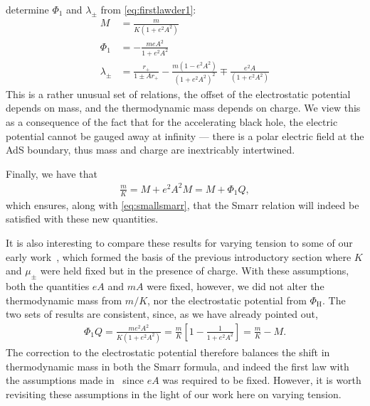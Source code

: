 \documentclass[
twoside,
openright,
frontopenright,
]{dmathesis}
\newcommand{\nn}{\nonumber}
\begin{document}
determine $\Phi_1$ and $\lambda_\pm$ from \cref{eq:firstlawder1}:
\begin{align}
M &= \frac{m}{K(1+e^2 A^2)} \nn\\
\Phi_1 &= -\frac{meA^2}{1+e^2 A^2}\nn\\
\lambda_\pm &= \frac{r_+}{1\pm Ar_+} - \frac{m(1-e^2A^2)}{(1+e^2 A^2)^2} 
\mp \frac{e^2A}{(1+e^2 A^2)}
\label{TDparams}
\end{align}
This is a rather unusual set of relations, the offset of the electrostatic
potential depends on mass, and the thermodynamic mass depends on charge. We view
this as a consequence of the fact that for the accelerating black hole, the
electric potential cannot be gauged away at infinity --- there is a polar
electric field at the AdS boundary, thus mass and charge are inextricably
intertwined.

Finally, we have that
\begin{align}
  \frac{m}{K} = M+e^2A^2M = M+\Phi_1Q,
\end{align}
which ensures, along with \cref{eq:smallsmarr}, that the Smarr relation will
indeed be satisfied with these new quantities.

It is also interesting to compare these results for varying tension to some of
our early work~\cite{Appels:2016uha}, which formed the basis of the previous
introductory section where $K$ and $\mu_\pm$ were held fixed but in the presence
of charge. With these assumptions, both the quantities $eA$ and $mA$ were fixed,
however, we did not alter the thermodynamic mass from $m/K$, nor the
electrostatic potential from $\Phi_\mathrm{H}$. The two sets of results are
consistent, since, as we have already pointed out,
\begin{align*}
\Phi_1 Q = \frac{m e^2 A^2}{K(1+e^2 A^2)} 
= \frac{m}{K} \left [ 1 - \frac{1}{1+e^2 A^2} \right] = \frac{m}{K} - M.
\end{align*}
The correction to the electrostatic potential therefore balances the shift in
thermodynamic mass in both the Smarr formula, and indeed the first law with the
assumptions made in~\cite{Appels:2016uha} since $eA$ was required to be
fixed. However, it is worth revisiting these assumptions in the light of our
work here on varying tension.
\end{document}
